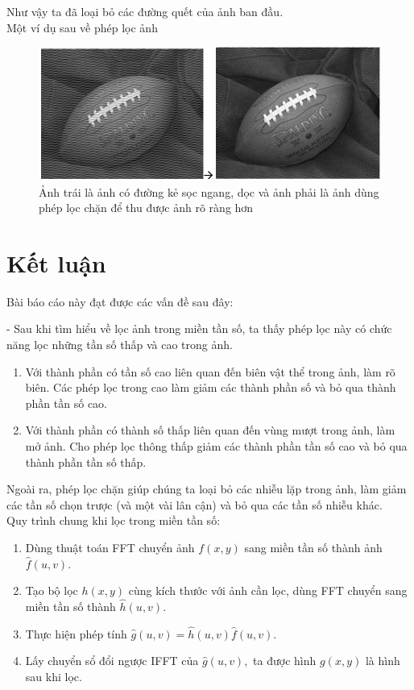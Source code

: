 \documentclass[12pt,a4paper]{report}
\numberwithin{equation}{section}
\theoremstyle{definition} %
\begin{document}
    Như vậy ta đã loại bỏ các đường quết của ảnh ban đầu.
    \\

    Một ví dụ sau về phép lọc ảnh

\begin{figure}[H]
\centering
\includegraphics[width=0.86\linewidth]{img/locChan/bongbauduclocchan.png}
\caption{Ảnh trái là ảnh có đường kẻ sọc ngang, dọc và ảnh phải là ảnh dùng phép lọc chặn để thu được ảnh rõ ràng hơn }
\label{fig145}
\end{figure}
	\chapter*{Kết luận}
	Bài báo cáo này đạt được các vấn đề sau đây:

   - Sau khi tìm hiểu về lọc ảnh trong miền tần số, ta thấy phép lọc này có chức năng lọc những tần số thấp và cao trong ảnh.
    \begin{enumerate}
        \item Với thành phần có tần số cao liên quan đến biên vật thể trong ảnh, làm rõ biên. Các phép lọc trong cao làm giảm các thành phần số và bỏ qua thành phần tần số cao.
        \item Với thành phần có thành số thấp liên quan đến vùng mượt trong ảnh, làm mở ảnh. Cho phép lọc thông thấp giảm các thành phần tần số cao và bỏ qua thành phần tần số thấp.
    \end{enumerate}

   Ngoài ra, phép lọc chặn giúp chúng ta loại bỏ các nhiễu lặp trong ảnh, làm giảm các tần số chọn trược (và một vài lân cận) và bỏ qua các tần số nhiễu khác.
   \\

   Quy trình chung khi lọc trong miền tần số:

   \begin{enumerate}
       \item Dùng thuật toán FFT chuyển ảnh $f(x,y)$ sang miền tần số thành ảnh $\hat{f}(u,v)$.
       \item Tạo bộ lọc $h(x,y)$ cùng kích thước với ảnh cần lọc, dùng FFT chuyển sang miền tần số thành $\hat{h}(u,v).$
    \item Thực hiện phép tính $\hat{g}(u,v)=\hat{h}(u,v)\hat{f}(u,v).$
    \item Lấy chuyển sổ đổi ngược IFFT của $\hat{g}(u,v),$ ta được hình $g(x,y)$ là hình sau khi lọc.
   \end{enumerate}
	\indent
	\thispagestyle{fancy}
	
\end{document}
